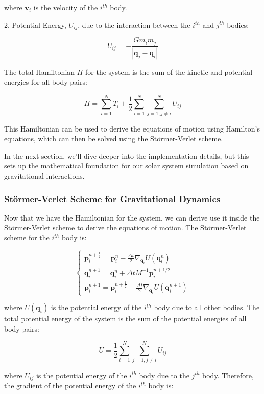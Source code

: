 \documentclass{article}
\begin{document}
where \(\mathbf{v}_i\) is the velocity of the \(i^{th}\) body.

2. Potential Energy, \(U_{ij}\), due to the interaction between the \(i^{th}\) and \(j^{th}\) bodies:

\[
	U_{ij} = -\frac{G m_i m_j}{|\mathbf{q}_j - \mathbf{q}_i|}
\]

The total Hamiltonian \(H\) for the system is the sum of the kinetic and potential energies for all body pairs:

\[
	H = \sum_{i=1}^{N} T_i + \frac{1}{2} \sum_{i=1}^{N} \sum_{j=1, j\neq i}^{N} U_{ij}
\]

This Hamiltonian can be used to derive the equations of motion using Hamilton's equations, which can then be solved using the Störmer-Verlet scheme.

In the next section, we'll dive deeper into the implementation details, but this sets up the mathematical foundation for our solar system simulation based on gravitational interactions.

\subsubsection{Störmer-Verlet Scheme for Gravitational Dynamics}
\label{sec:stormer_verlet_scheme_gravitational_dynamics}

Now that we have the Hamiltonian for the system, we can derive use it inside the Störmer-Verlet scheme to derive the equations of motion. The Störmer-Verlet scheme for the \(i^{th}\) body is:

\[
	\begin{cases}
		\mathbf{p}_i^{n + \frac{1}{2}} = \mathbf{p}_i^n - \frac{\Delta t}{2} \nabla_{\mathbf{q}_i} U(\mathbf{q}^n_i) \\
		\mathbf{q}_i^{n+1} = \mathbf{q}_i^{n} + \Delta t M^{-1} \mathbf{p}_i^{n+1/2} \\
		\mathbf{p}_i^{n+1} = \mathbf{p}_i^{n+\frac{1}{2}} - \frac{\Delta t}{2} \nabla_{\mathbf{q}_i} U(\mathbf{q}^{n+1}_i)
	\end{cases}
\]

where \(U(\mathbf{q}_i)\) is the potential energy of the \(i^{th}\) body due to all other bodies. The total potential energy of the system is the sum of the potential energies of all body pairs:

\[
	U = \frac{1}{2} \sum_{i=1}^{N} \sum_{j=1, j\neq i}^{N} U_{ij}
\]

where \(U_{ij}\) is the potential energy of the \(i^{th}\) body due to the \(j^{th}\) body. Therefore, the gradient of the potential energy of the \(i^{th}\) body is:
\end{document}
